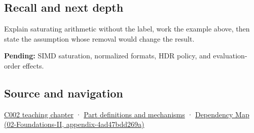 \subsection{Recall and next depth}\label{appendix-3999c6209649-recall-and-next-depth}

Explain saturating arithmetic without the label, work the example above, then state the assumption whose removal would change the result.

\textbf{Pending:} SIMD saturation, normalized formats, HDR policy, and evaluation-order effects.

\subsection{Source and navigation}\label{appendix-3999c6209649-source-and-navigation}

\hyperref[01-foundations-i-ch001-arithmetic-becomes-a-policy]{C002 teaching chapter} · \hyperref[appendix-fd090d982a15]{Part definitions and mechanisms} · \href{../02-Foundations-II/main.pdf\#nameddest=appendix-4ad47bdd269a}{Dependency Map (02-Foundations-II, appendix-4ad47bdd269a)}
